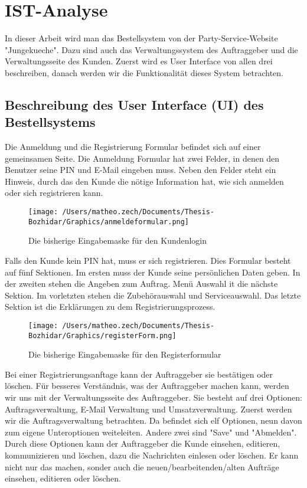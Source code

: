\chapter{IST-Analyse}
In dieser Arbeit wird man das Bestellsystem von der Party-Service-Website "Jungekueche". Dazu sind auch das Verwaltungssystem des Auftraggeber und die Verwaltungsseite des Kunden. Zuerst wird es User Interface von allen drei beschreiben, danach werden wir die Funktionalität dieses System betrachten.

\section{Beschreibung des User Interface (UI) des Bestellsystems} 

Die Anmeldung und die Registrierung Formular befindet sich auf einer gemeinsamen Seite. 
Die Anmeldung Formular hat zwei Felder, in denen den Benutzer seine PIN und E-Mail eingeben muss. Neben den Felder steht ein Hinweis, durch das den Kunde die nötige Information hat, wie sich anmelden oder sich registrieren kann.  


\begin{figure}[h]
	\centering
	\texttt{[image: /Users/matheo.zech/Documents/Thesis-Bozhidar/Graphics/anmeldeformular.png]}
	\caption[Anmeldeformular]{Die bisherige Eingabemaske für den Kundenlogin}
	\label{fig:anmeldeformular}
\end{figure}


Falls den Kunde kein PIN hat, muss er sich registrieren. Dies Formular besteht auf fünf Sektionen. Im ersten muss der Kunde seine persönlichen Daten geben. In der zweiten stehen die Angeben zum Auftrag. Menü Auswahl it die nächste Sektion. Im vorletzten stehen die Zubehörauswahl und Serviceauswahl. Das letzte Sektion ist die Erklärungen zu dem Registrierungsprozess. 

\begin{figure}
	\centering
	\texttt{[image: /Users/matheo.zech/Documents/Thesis-Bozhidar/Graphics/registerForm.png]}
	\caption[Registerformular]{Die bisherige Eingabemaske für den Registerformular}
	\label{fig:registerForm}
\end{figure}

Bei einer Registrierungsanftage kann der Auftraggeber sie bestätigen oder löschen. Für besseres Verständnis, was der Auftraggeber machen kann, werden wir uns mit der Verwaltungsseite des Auftraggeber. Sie besteht auf drei Optionen: Auftragsverwaltung, E-Mail Verwaltung und Umsatzverwaltung. Zuerst werden wir die Auftragsverwaltung betrachten. Da befindet sich elf Optionen, neun davon zum eigene Unteroptionen weiteleiten. Andere zwei sind "Save" und "Abmelden". Durch diese Optionen kann der Auftraggeber die Kunde einsehen, editieren, kommunizieren und löschen, dazu die Nachrichten einlesen oder löschen. Er kann nicht nur das machen, sonder auch die neuen/bearbeitenden/alten Aufträge einsehen, editieren oder löschen.

